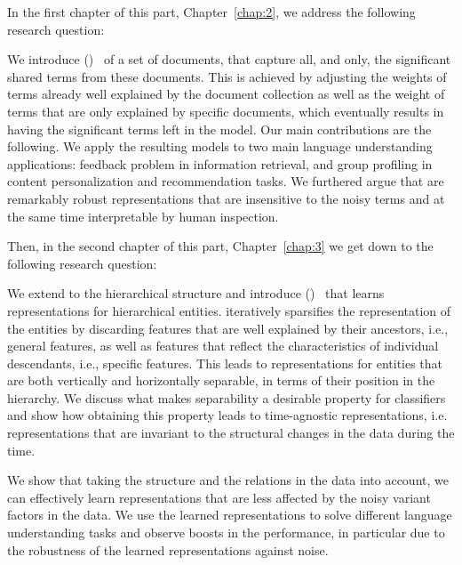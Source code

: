 In the first chapter of this part, Chapter~\ref{chap:2}, we address the following research question:
\begin{resqbox}
\emph{}
\end{resqbox}
We introduce \emph{\swlms} (\acswlm)~\citep{Dehghani:2016:SIGIR} of a set of documents, that capture all, and only, the significant shared terms from these documents.  This is achieved by adjusting the weights of terms already well explained by the document collection as well as the weight of terms that are only explained by specific documents, which eventually results in having the significant terms left in the model. 
Our main contributions are the following.
We apply the resulting models to two main language understanding applications: feedback problem in information retrieval\citep{Dehghani:CIKM2016:long, Dehghani:CIKM2016:short}, and group profiling in content personalization and recommendation tasks\citep{Dehghani:2016:CHIIR,Dehghani2016:trec}. We furthered argue that \acswlm are remarkably robust representations that are insensitive to the noisy terms and at the same time interpretable by human inspection. 

Then, in the second chapter of this part, Chapter~\ref{chap:3} we get down to the following research question:
\begin{resqbox}
\emph{}
\end{resqbox}
We extend \emph{\swlms} to the hierarchical structure and introduce \emph{\hswlms} (\achswlm)~\citep{Dehghani:2016:ICTIR, Dehghani:2016:CLEF} that learns representations for hierarchical entities. \achswlm iteratively sparsifies the representation of the entities by discarding features that are well explained by their ancestors, i.e., general features, as well as features that reflect the characteristics of individual descendants, i.e., specific features. This leads to representations for entities that are both vertically and horizontally separable, in terms of their position in the hierarchy. We discuss what makes separability a desirable property for classifiers and show how obtaining this property leads to time-agnostic representations, i.e.  representations that are invariant to the structural changes in the data during the time.

\medskip
We show that taking the structure and the relations in the data into account, we can effectively learn representations that are less affected by the noisy variant factors in the data. We use the learned representations to solve different language understanding tasks and observe boosts in the performance, in particular due to the robustness of the learned representations against noise.

% 
% 
